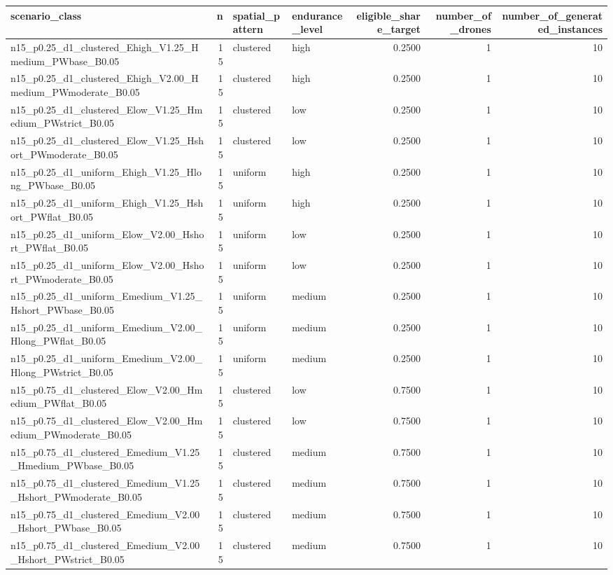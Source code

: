 \begin{tabular}{lrllrrr}
\toprule
scenario_class & n & spatial_pattern & endurance_level & eligible_share_target & number_of_drones & number_of_generated_instances \\
\midrule
n15_p0.25_d1_clustered_Ehigh_V1.25_Hmedium_PWbase_B0.05 & 15 & clustered & high & 0.2500 & 1 & 10 \\
n15_p0.25_d1_clustered_Ehigh_V2.00_Hmedium_PWmoderate_B0.05 & 15 & clustered & high & 0.2500 & 1 & 10 \\
n15_p0.25_d1_clustered_Elow_V1.25_Hmedium_PWstrict_B0.05 & 15 & clustered & low & 0.2500 & 1 & 10 \\
n15_p0.25_d1_clustered_Elow_V1.25_Hshort_PWmoderate_B0.05 & 15 & clustered & low & 0.2500 & 1 & 10 \\
n15_p0.25_d1_uniform_Ehigh_V1.25_Hlong_PWbase_B0.05 & 15 & uniform & high & 0.2500 & 1 & 10 \\
n15_p0.25_d1_uniform_Ehigh_V1.25_Hshort_PWflat_B0.05 & 15 & uniform & high & 0.2500 & 1 & 10 \\
n15_p0.25_d1_uniform_Elow_V2.00_Hshort_PWflat_B0.05 & 15 & uniform & low & 0.2500 & 1 & 10 \\
n15_p0.25_d1_uniform_Elow_V2.00_Hshort_PWmoderate_B0.05 & 15 & uniform & low & 0.2500 & 1 & 10 \\
n15_p0.25_d1_uniform_Emedium_V1.25_Hshort_PWbase_B0.05 & 15 & uniform & medium & 0.2500 & 1 & 10 \\
n15_p0.25_d1_uniform_Emedium_V2.00_Hlong_PWflat_B0.05 & 15 & uniform & medium & 0.2500 & 1 & 10 \\
n15_p0.25_d1_uniform_Emedium_V2.00_Hlong_PWstrict_B0.05 & 15 & uniform & medium & 0.2500 & 1 & 10 \\
n15_p0.75_d1_clustered_Elow_V2.00_Hmedium_PWflat_B0.05 & 15 & clustered & low & 0.7500 & 1 & 10 \\
n15_p0.75_d1_clustered_Elow_V2.00_Hmedium_PWmoderate_B0.05 & 15 & clustered & low & 0.7500 & 1 & 10 \\
n15_p0.75_d1_clustered_Emedium_V1.25_Hmedium_PWbase_B0.05 & 15 & clustered & medium & 0.7500 & 1 & 10 \\
n15_p0.75_d1_clustered_Emedium_V1.25_Hshort_PWmoderate_B0.05 & 15 & clustered & medium & 0.7500 & 1 & 10 \\
n15_p0.75_d1_clustered_Emedium_V2.00_Hshort_PWbase_B0.05 & 15 & clustered & medium & 0.7500 & 1 & 10 \\
n15_p0.75_d1_clustered_Emedium_V2.00_Hshort_PWstrict_B0.05 & 15 & clustered & medium & 0.7500 & 1 & 10 \\

\end{tabular}
